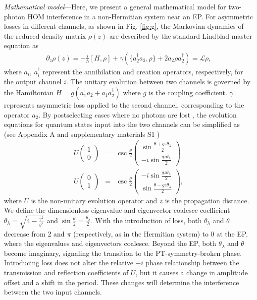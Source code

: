 \documentclass[%
reprint,
superscriptaddress,
amsthm,amsmath,amssymb,
aps,
]{revtex4-1}
\begin{document}
\noindent \textit{Mathematical model}—Here, we present a general mathematical model for two-photon HOM interference in a non-Hermitian system near an EP. For asymmetric losses in different channels, as shown in Fig. \ref{fig:g}, the Markovian dynamics of the reduced density matrix $\rho(z)$ are described by the standard Lindblad master equation as \cite{lindblad1976generators,klauck2019observation}
\begin{eqnarray}
	\partial_{z}\rho(z)=-\frac{i}{\hbar}[H,\rho]+\gamma(\{a_{2}^{\dagger}a_{2},\rho\}+2a_{2}\rho a_{2}^{\dagger})=\mathcal{L}\rho\label{2},
\end{eqnarray}
where $a_{i}$, $a_{i}^{\dagger}$ represent the annihilation and creation operators, respectively, for the output channel $i$. The unitary evolution between two channels is governed by the Hamiltonian $H=g(a_1^\dagger a_2 + a_1 a_2^\dagger)$ where $g$ is the coupling coefficient. $\gamma$ represents asymmetric loss applied to the second channel, corresponding to the operator $a_{2}$. By postselecting cases where no photons are lost \cite{klauck2025crossing,grafe2013correlations}, the evolution equations for quantum states input into the two channels can be simplified as (see Appendix A and supplementary materials S1 \cite{SupplementalMaterial})
\begin{eqnarray}\label{4}
	U\begin{pmatrix} 1 \\ 0	\end{pmatrix}&=&\csc\frac{\theta}{2}\begin{pmatrix} \sin \frac{\theta+gz\theta_{\lambda}}{2} \\ -i \sin \frac{gz\theta_{\lambda}}{2} \end{pmatrix}\nonumber\\
	U\begin{pmatrix} 0 \\ 1	\end{pmatrix}&=&\csc\frac{\theta}{2}\begin{pmatrix}	-i \sin \frac{gz\theta_{\lambda}}{2} \\ \sin \frac{\theta-gz\theta_{\lambda}}{2} \end{pmatrix},
\end{eqnarray}
where $U$ is the non-unitary evolution operator and $z$ is the propagation distance. We define the dimensionless eigenvalue and eigenvector coalesce coefficient  $\theta_{\lambda}=\sqrt{4- \frac{\gamma^{2}}{g^{2}}} $ and  $\sin\frac{\theta}{2}=\frac{\theta_{\lambda}}{2}$. With the introduction of loss, both $\theta_{\lambda}$ and $\theta$ decrease from 2 and $\pi$ (respectively, as in the Hermitian system) to 0 at the EP, where the eigenvalues and eigenvectors coalesce. Beyond the EP, both $\theta_{\lambda}$ and $\theta$ become imaginary, signaling the transition to the PT-symmetry-broken phase. Introducing loss does not alter the relative $-i$ phase relationship between the transmission and reflection coefficients of $U$, but it causes a change in amplitude offset and a shift in the period. These changes will determine the interference between the two input channels.
\end{document}
